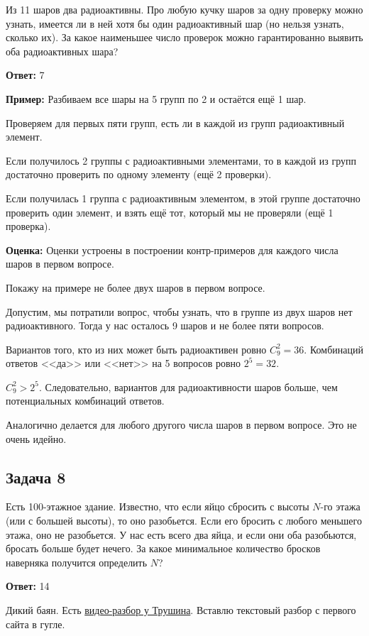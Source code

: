 Из 11 шаров два радиоактивны. Про любую кучку шаров за одну проверку можно
узнать, имеется ли в ней хотя бы один радиоактивный шар (но нельзя узнать, сколько
их). За какое наименьшее число проверок можно гарантированно выявить оба радиоактивных шара?

\textbf{Ответ:} 7

\textbf{Пример:} Разбиваем все шары на 5 групп по 2 и остаётся ещё 1 шар.

Проверяем для первых пяти групп, есть ли в каждой из групп радиоактивный элемент. 

Если получилось 2 группы с радиоактивными элементами, то в каждой из групп достаточно проверить по одному элементу (ещё 2 проверки).

Если получилась 1 группа с радиоактивным элементом, в этой группе достаточно проверить один элемент, и взять ещё тот, который мы не проверяли (ещё 1 проверка).

\textbf{Оценка:} Оценки устроены в построении контр-примеров для каждого числа шаров в первом вопросе.

Покажу на примере не более двух шаров в первом вопросе.

Допустим, мы потратили вопрос, чтобы узнать, что в группе из двух шаров нет радиоактивного. Тогда у нас осталось 9 шаров и не более пяти вопросов. 

Вариантов того, кто из них может быть радиоактивен ровно $C^2_9 = 36$. Комбинаций ответов <<да>> или <<нет>> на 5 вопросов ровно $2^5 = 32$.

$C^2_9 > 2^5$. Следовательно, вариантов для радиоактивности шаров больше, чем потенциальных комбинаций ответов.

Аналогично делается для любого другого числа шаров в первом вопросе. Это не очень идейно.

\subsection{Задача 8}

Есть 100-этажное здание. Известно, что если яйцо сбросить с высоты $N$-го этажа
(или с большей высоты), то оно разобьется. Если его бросить с любого меньшего этажа, оно не разобьется. У нас есть всего два яйца, и если они оба разобьются, бросать
больше будет нечего. За какое минимальное количество бросков наверняка получится определить $N$?

\textbf{Ответ:} 14

Дикий баян. Есть \href{https://youtu.be/f2VLdwU9xc4?si=poEv93D02R2l0ry1&t=2396}{видео-разбор у Трушина}. Вставлю текстовый разбор с первого сайта в гугле.

